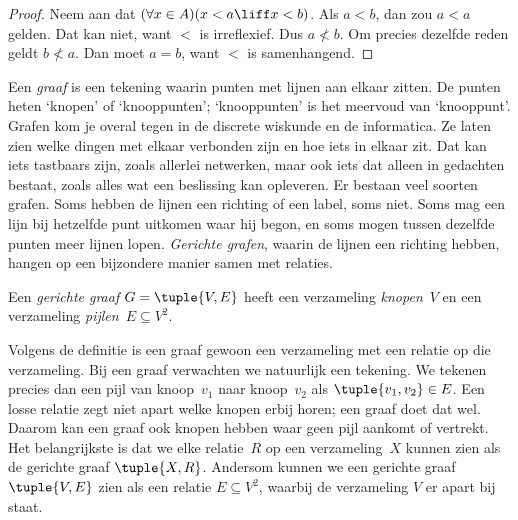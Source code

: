 \documentclass[openany]{memoir}
\begin{document}
\begin{proof}
Neem aan dat $(\forall x \in A)(x < a \liff x < b)$. Als $a < b$, dan zou
$a < a$ gelden. Dat kan niet, want $<$ is irreflexief. Dus $a \nless b$.
Om precies dezelfde reden geldt $b \nless a$. Dan moet $a = b$, want $<$ is
samenhangend.
\end{proof}
\endgroup

\begingroup
\def\olfilename{OLP-0017}
\def\olfilepath{content/sets-functions-relations/relations/}
\hypertarget{unit-OLP-0017}{}




Een \emph{graaf} is een tekening waarin punten met lijnen aan elkaar
zitten. De punten heten ‘knopen’ of ‘knooppunten’; ‘knooppunten’ is het
meervoud van ‘knooppunt’. Grafen kom je overal tegen in de discrete
wiskunde en de informatica. Ze laten zien welke dingen met elkaar
verbonden zijn en hoe iets in elkaar zit. Dat kan iets tastbaars zijn,
zoals allerlei netwerken, maar ook iets dat alleen in gedachten bestaat,
zoals alles wat een beslissing kan opleveren. Er bestaan veel soorten
grafen.
Soms hebben de lijnen een richting of een label, soms niet. Soms mag
een lijn bij hetzelfde punt uitkomen waar hij begon, en soms mogen
tussen dezelfde punten meer lijnen lopen. \emph{Gerichte grafen},
waarin de lijnen een richting hebben, hangen op een bijzondere manier
samen met relaties.

\begin{defn}
Een \emph{gerichte graaf} $G = \tuple{V, E}$ heeft een verzameling
\emph{knopen}~$V$ en een verzameling \emph{pijlen}~$E \subseteq V^2$.
\end{defn}

\begin{explain}
Volgens de definitie is een graaf gewoon een verzameling met een
relatie op die verzameling. Bij een graaf verwachten we natuurlijk
een tekening. We tekenen precies dan een pijl van knoop~$v_1$ naar
knoop~$v_2$ als $\tuple{v_1, v_2} \in E$. Een losse relatie zegt niet
apart welke knopen erbij horen; een graaf doet dat wel. Daarom kan een
graaf ook knopen hebben waar geen pijl aankomt of vertrekt. Het
belangrijkste is dat we elke relatie~$R$ op een verzameling~$X$ kunnen
zien als de gerichte graaf $\tuple{X, R}$. Andersom kunnen we een
gerichte graaf~$\tuple{V, E}$ zien als een relatie $E \subseteq V^2$,
waarbij de verzameling $V$ er apart bij staat.
\end{explain}
\end{document}
